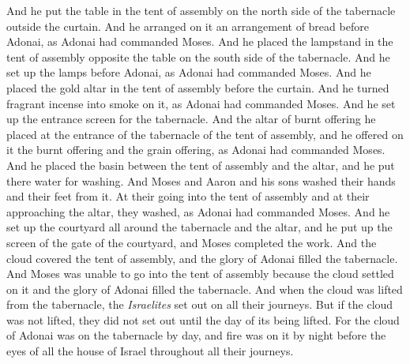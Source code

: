 \begin{biblechapter}
\verse And he put the table in the tent of assembly on the north side of the tabernacle outside the curtain.
\verse And he arranged on it an arrangement of bread before Adonai, as Adonai had commanded Moses.
\verse And he placed the lampstand in the tent of assembly opposite the table on the south side of the tabernacle.
\verse And he set up the lamps before Adonai, as Adonai had commanded Moses.
\verse And he placed the gold altar in the tent of assembly before the curtain.
\verse And he turned fragrant incense into smoke on it, as Adonai had commanded Moses.
\verse And he set up the entrance screen for the tabernacle.
\verse And the altar of burnt offering he placed at the entrance of the tabernacle of the tent of assembly, and he offered on it the burnt offering and the grain offering, as Adonai had commanded Moses.
\verse And he placed the basin between the tent of assembly and the altar, and he put there water for washing.
\verse And Moses and Aaron and his sons washed their hands and their feet from it.
\verse At their going into the tent of assembly and at their approaching the altar, they washed, as Adonai had commanded Moses.
\verse And he set up the courtyard all around the tabernacle and the altar, and he put up the screen of the gate of the courtyard, and Moses completed the work.
\verse And the cloud covered the tent of assembly, and the glory of Adonai filled the tabernacle.
\verse And Moses was unable to go into the tent of assembly because the cloud settled on it and the glory of Adonai filled the tabernacle.
\verse And when the cloud was lifted from the tabernacle, the \textit{Israelites} set out on all their journeys.
\verse But if the cloud was not lifted, they did not set out until the day of its being lifted.
\verse For the cloud of Adonai was on the tabernacle by day, and fire was on it by night before the eyes of all the house of Israel throughout all their journeys.
\end{biblechapter}

